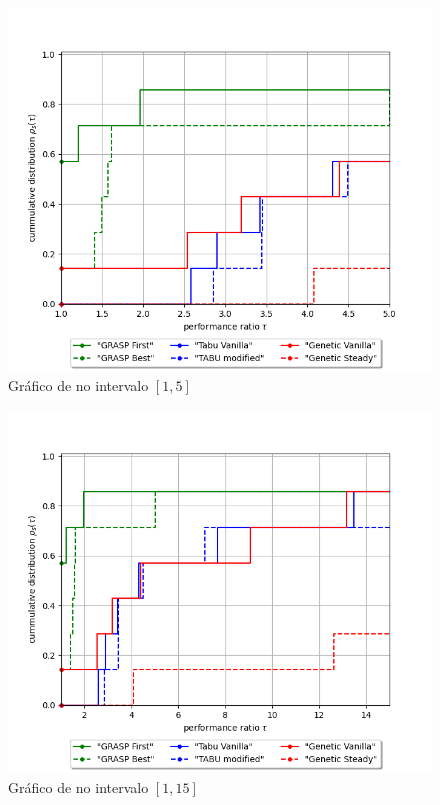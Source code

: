 \section{\perfprof}
\label{appendix:performance-profiles}

\begin{figure}[H]
    \centering
    \includegraphics[width=\textwidth]{figure/performance_profile/performance_profile_thmax_5.0.png}
    \caption{Gráfico de \perfprof no intervalo $[1, 5]$}
    \label{fig:performance-profile-5}
\end{figure}

\begin{figure}[H]
    \centering
    \includegraphics[width=\textwidth]{figure/performance_profile/performance_profile_thmax_15.0.png}
    \caption{Gráfico de \perfprof no intervalo $[1, 15]$}
    \label{fig:performance-profile-15}
\end{figure}

